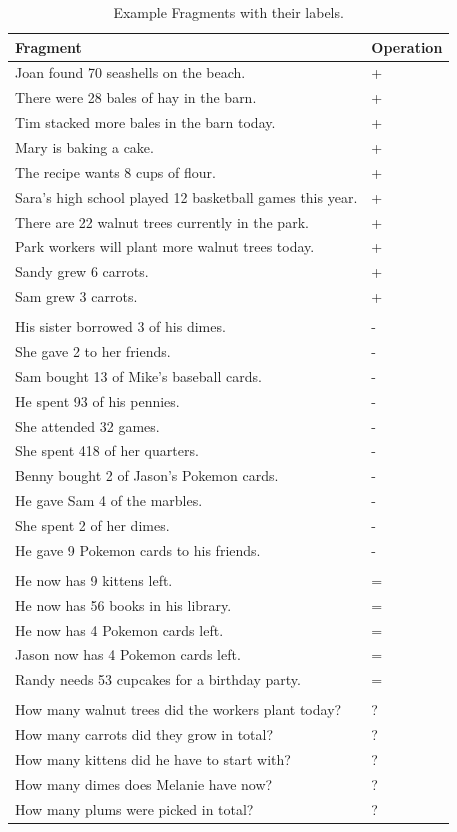 \documentclass[11pt]{article}
\begin{document}
\begin{table}[h!]
\centering
\begin{tabular}{ | m{25em} | m{10em} | }
\hline
\textbf{Fragment} & \textbf{Operation}\\
\hline
Joan found 70 seashells on the beach. & + \\
\hline
There were 28 bales of hay in the barn. & + \\
\hline
Tim stacked more bales in the barn today.& + \\
\hline
Mary is baking a cake.& + \\
\hline
The recipe wants 8 cups of flour.& + \\
\hline
Sara's high school played 12 basketball games this year.& + \\
\hline
There are 22 walnut trees currently in the park.& + \\
\hline
Park workers will plant more walnut trees today.& + \\
\hline
Sandy grew 6 carrots.& + \\
\hline
Sam grew 3 carrots.& + \\
\hline
\\
\hline
His sister borrowed 3 of his dimes.& - \\
\hline
She gave 2 to her friends.& - \\
\hline
Sam bought 13 of Mike's baseball cards.& - \\
\hline
He spent 93 of his pennies.& - \\
\hline
She attended 32 games.& - \\
\hline
She spent 418 of her quarters.& - \\
\hline
Benny bought 2 of Jason's  Pokemon cards.& - \\
\hline
He gave Sam 4 of the marbles.& - \\
\hline
She spent 2 of her dimes.& - \\
\hline
He gave 9 Pokemon cards to his friends.& - \\
\hline
\\
\hline
He now has 9 kittens left.& = \\
\hline
He now has 56 books in his library.& = \\
\hline
He now has 4 Pokemon cards left.& = \\
\hline
Jason now has 4 Pokemon cards left.& = \\
\hline
Randy needs 53 cupcakes for a birthday party.& = \\
\hline
\\
\hline
How many walnut trees did the workers plant today? & ? \\
\hline
How many carrots did they grow in total? & ? \\
\hline
How many kittens did he have to start with? & ? \\
\hline
How many dimes does Melanie have now? & ? \\
\hline
How many plums were picked in total? & ? \\
\hline
\end{tabular}
\caption{Example Fragments with their labels.}
\label{figure:1}
\end{table}

\newpage


\end{document}
